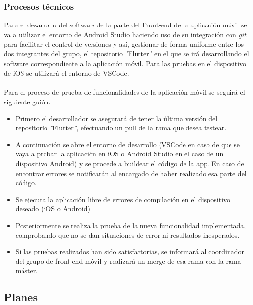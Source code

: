 \documentclass{article}
\begin{document}
\subsubsection{Procesos técnicos}
Para el desarrollo del software de la parte del Front-end de la aplicación móvil se va a utilizar el entorno de Android Studio haciendo uso de su integración con \textit{git} para facilitar el control de versiones y así, gestionar de forma uniforme entre los dos integrantes del grupo, el repositorio \textit{"}Flutter\textit{"} en el que se irá desarrollando el software correspondiente a la aplicación móvil. Para las pruebas en el dispositivo de iOS se utilizará el entorno de VSCode.\\\\
Para el proceso de prueba de funcionalidades de la aplicación móvil se seguirá el siguiente guión:
	\begin{itemize}
		\item Primero el desarrollador se asegurará de tener la última versión del repositorio \textit{"}Flutter\textit{"}, efectuando un pull de la rama que desea testear.
		
		\item A continuación se abre el entorno de desarrollo (VSCode en caso de que se vaya a probar la aplicación en iOS o Android Studio en el caso de un dispositivo Android) y se procede a buildear el código de la app. En caso de encontrar errores se notificarán al encargado de haber realizado esa parte del código.
		
		\item Se ejecuta la aplicación libre de errores de compilación en el dispositivo deseado (iOS o Android)
		
		\item Posteriormente se realiza la prueba de la nueva funcionalidad implementada, comprobando que no se dan situaciones de error ni resultados inesperados.
		
		\item Si las pruebas realizados han sido satisfactorias, se informará al coordinador del grupo de front-end móvil y realizará un merge de esa rama con la rama máster.
	\end{itemize}
\newpage
\subsection{Planes}
\end{document}
